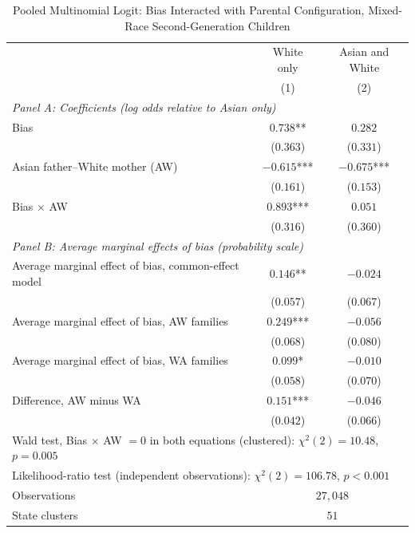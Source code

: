 \documentclass[12pt,english]{article}
\begin{document}
\pagebreak
\newpage

\begin{table}[H]
\centering
\small{}
\caption{Pooled Multinomial Logit: Bias Interacted with Parental Configuration, Mixed-Race Second-Generation Children \label{tab:pooled-mnl-bias-x-aw}}
\begin{threeparttable}
\begin{tabular}{lcc}
\toprule
 & White only & Asian and White \\
 & (1) & (2) \\
\midrule
\multicolumn{3}{l}{\textit{Panel A: Coefficients (log odds relative to Asian only)}} \\
Bias & $0.738$** & $0.282$ \\
 & ($0.363$) & ($0.331$) \\
Asian father--White mother (AW) & $-0.615$*** & $-0.675$*** \\
 & ($0.161$) & ($0.153$) \\
Bias $\times$ AW & $0.893$*** & $0.051$ \\
 & ($0.316$) & ($0.360$) \\
\midrule
\multicolumn{3}{l}{\textit{Panel B: Average marginal effects of bias (probability scale)}} \\
Average marginal effect of bias, common-effect model & $0.146$** & $-0.024$ \\
 & ($0.057$) & ($0.067$) \\
Average marginal effect of bias, AW families & $0.249$*** & $-0.056$ \\
 & ($0.068$) & ($0.080$) \\
Average marginal effect of bias, WA families & $0.099$* & $-0.010$ \\
 & ($0.058$) & ($0.070$) \\
Difference, AW minus WA & $0.151$*** & $-0.046$ \\
 & ($0.042$) & ($0.066$) \\
\midrule
\multicolumn{3}{l}{Wald test, Bias $\times$ AW $= 0$ in both equations (clustered): $\chi^2(2) = 10.48$, $p = 0.005$} \\
\multicolumn{3}{l}{Likelihood-ratio test (independent observations): $\chi^2(2) = 106.78$, $p < 0.001$} \\
Observations & \multicolumn{2}{c}{$27{,}048$} \\
State clusters & \multicolumn{2}{c}{$51$} \\

\end{tabular}
\end{threeparttable}
\end{table}
\end{document}
